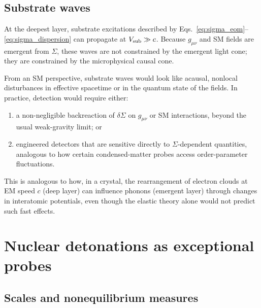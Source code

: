 \documentclass[aps,prd,twocolumn,nofootinbib,superscriptaddress]{revtex4-2}
\begin{document}
\subsection{Substrate waves}
\label{subsec:substrate_waves}

At the deepest layer, substrate excitations described by Eqs.~\eqref{eq:sigma_eom}--\eqref{eq:sigma_dispersion} can propagate at $V_{\rm sub} \gg c$. Because $g_{\mu\nu}$ and SM fields are emergent from $\Sigma$, these waves are not constrained by the emergent light cone; they are constrained by the microphysical causal cone.

From an SM perspective, substrate waves would look like acausal, nonlocal disturbances in effective spacetime or in the quantum state of the fields. In practice, detection would require either:
\begin{enumerate}
    \item a non-negligible backreaction of $\delta\Sigma$ on $g_{\mu\nu}$ or SM interactions, beyond the usual weak-gravity limit; or
    \item engineered detectors that are sensitive directly to $\Sigma$-dependent quantities, analogous to how certain condensed-matter probes access order-parameter fluctuations.
\end{enumerate}

This is analogous to how, in a crystal, the rearrangement of electron clouds at EM speed $c$ (deep layer) can influence phonons (emergent layer) through changes in interatomic potentials, even though the elastic theory alone would not predict such fast effects.

\section{Nuclear detonations as exceptional probes}
\label{sec:nuclear}

\subsection{Scales and nonequilibrium measures}
\end{document}
